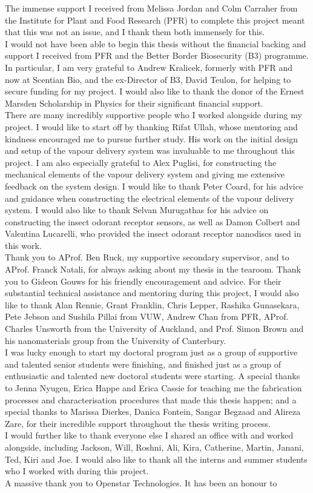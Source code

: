 \documentclass[
  a4paper,
]{scrbook}
\begin{document}
The immense support I received from Melissa Jordan and Colm Carraher from the Institute for Plant and Food Research (PFR) to complete this project meant that this was not an issue, and I thank them both immensely for this. \\[5pt] I would not have been able to begin this thesis without the financial backing and support I received from PFR and the Better Border Biosecurity (B3) programme. In particular, I am very grateful to Andrew Kralicek, formerly with PFR and now at Scentian Bio, and the ex-Director of B3, David Teulon, for helping to secure funding for my project. I would also like to thank the donor of the Ernest Marsden Scholarship in Physics for their significant financial support. \\[5pt] There are many incredibly supportive people who I worked alongside during my project. I would like to start off by thanking Rifat Ullah, whose mentoring and kindness encouraged me to pursue further study. His work on the initial design and setup of the vapour delivery system was invaluable to me throughout this project. I am also especially grateful to Alex Puglisi, for constructing the mechanical elements of the vapour delivery system and giving me extensive feedback on the system design. I would like to thank Peter Coard, for his advice and guidance when constructing the electrical elements of the vapour delivery system. I would also like to thank Selvan Murugathas for his advice on constructing the insect odorant receptor sensors, as well as Damon Colbert and Valentina Lucarelli, who provided the insect odorant receptor nanodiscs used in this work. \\[5pt] Thank you to AProf. Ben Ruck, my supportive secondary supervisor, and to AProf. Franck Natali, for always asking about my thesis in the tearoom. Thank you to Gideon Gouws for his friendly encouragement and advice. For their substantial technical assistance and mentoring during this project, I would also like to thank Alan Rennie, Grant Franklin, Chris Lepper, Rashika Gunasekara, Pete Jebson and Sushila Pillai from VUW, Andrew Chan from PFR, AProf. Charles Unsworth from the University of Auckland, and Prof. Simon Brown and his nanomaterials group from the University of Canterbury. \\[5pt] I was lucky enough to start my doctoral program just as a group of supportive and talented senior students were finishing, and finished just as a group of enthusiastic and talented new doctoral students were starting. A special thanks to Jenna Nyugen, Erica Happe and Erica Cassie for teaching me the fabrication processes and characterisation procedures that made this thesis happen; and a special thanks to Marissa Dierkes, Danica Fontein, Sangar Begzaad and Alireza Zare, for their incredible support throughout the thesis writing process. \\[5pt] I would further like to thank everyone else I shared an office with and worked alongside, including Jackson, Will, Roshni, Ali, Kira, Catherine, Martin, Janani, Ted, Kiri and Joe. I would also like to thank all the interns and summer students who I worked with during this project. \\[5pt] A massive thank you to Openstar Technologies. It has been an honour to 
\end{document}
